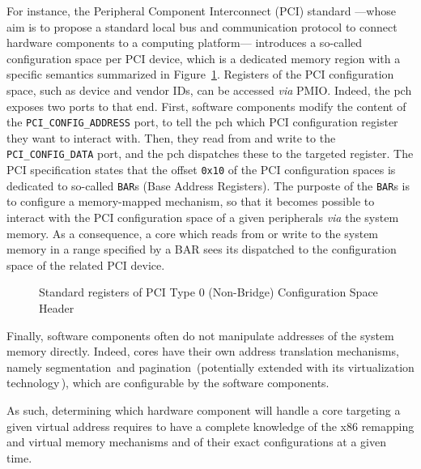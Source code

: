 For instance, the Peripheral Component Interconnect (PCI) standard ---whose aim
is to propose a standard local bus and communication protocol to connect
hardware components to a computing platform--- introduces a so-called
configuration space per PCI device, which is a dedicated memory region with a
specific semantics summarized in Figure~\ref{fig:usecase:pciconfig}.
%
Registers of the PCI configuration space, such as device and vendor IDs, can be
accessed \emph{via} PMIO.
%
Indeed, the \ac{pch} exposes two ports to that end.
%
First, software components modify the content of the
\texttt{PCI\_CONFIG\_ADDRESS} port, to tell the \ac{pch} which PCI configuration
register they want to interact with.
%
Then, they read from and write to the \texttt{PCI\_CONFIG\_DATA} port, and the
\ac{pch} dispatches these \IO to the targeted register.
%
The PCI specification states that the offset \texttt{0x10} of the PCI
configuration spaces is dedicated to so-called \texttt{BAR}s (Base Address
Registers).
%
The purposte of the \texttt{BAR}s is to configure a memory-mapped mechanism, so
that it becomes possible to interact with the PCI configuration space of a given
peripherals \emph{via} the system memory.
%
As a consequence, a core which reads from or write to the system memory in a
range specified by a BAR sees its \IO dispatched to the configuration space of
the related PCI device.

\begin{figure}
  \begin{center}
    \def\svgwidth{0.8\textwidth} \resizebox{0.6\textwidth}{!}{%
      }
  \end{center}
  \caption{Standard registers of PCI Type 0 (Non-Bridge) Configuration Space
    Header}
  \label{fig:usecase:pciconfig}
\end{figure}

Finally, software components often do not manipulate addresses of the system
memory directly.
%
Indeed, cores have their own address translation mechanisms, namely
segmentation\,\cite[Volume 3, Section 2.4]{intel2014manual} and
pagination\,\cite[Volume 3, Chapter 4]{intel2014manual} (potentially extended
with its virtualization technology\,\cite[Volume 3, Section
28.2]{intel2014manual}), which are configurable by the software components.

As such, determining which hardware component will handle a core \IO targeting a
given virtual address requires to have a complete knowledge of the x86 remapping
and virtual memory mechanisms and of their exact configurations at a given time.

